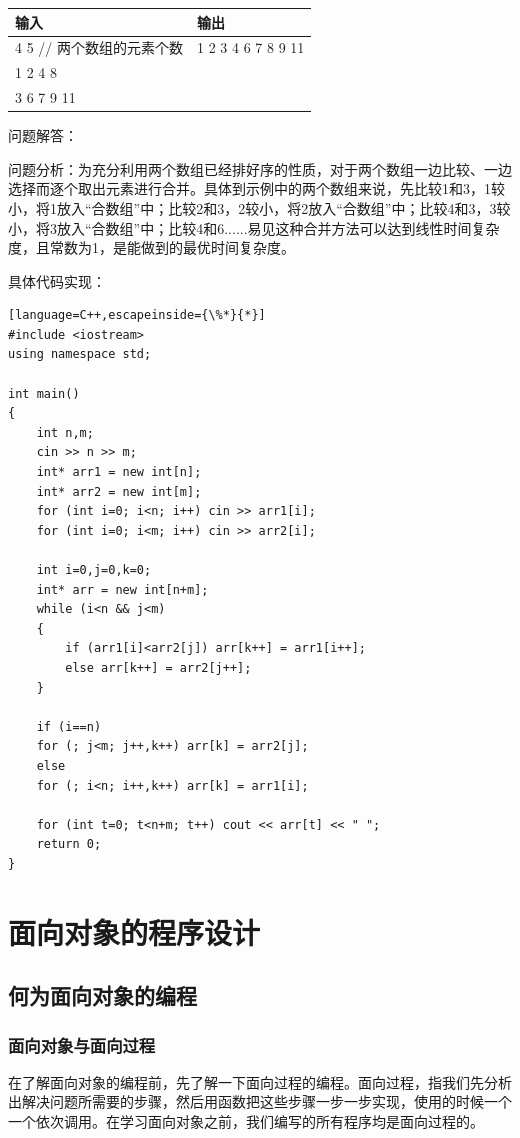 \documentclass[UTF8]{ctexart}
\begin{document}
\begin{itemize}
\begin{tabular}{|l|l|}
	\hline
	输入 & 输出 \\
	\hline
	4 5 // 两个数组的元素个数 & 1 2 3 4 6 7 8 9 11 \\
	1 2 4 8 & \\
	3 6 7 9 11 & \\
	\hline
\end{tabular}

问题解答：

问题分析：为充分利用两个数组已经排好序的性质，对于两个数组一边比较、一边选择而逐个取出元素进行合并。具体到示例中的两个数组来说，先比较1和3，1较小，将1放入“合数组”中；比较2和3，2较小，将2放入“合数组”中；比较4和3，3较小，将3放入“合数组”中；比较4和6......易见这种合并方法可以达到线性时间复杂度，且常数为1，是能做到的最优时间复杂度。

具体代码实现：
\begin{lstlisting}[language=C++,escapeinside={\%*}{*}]
#include <iostream>
using namespace std;

int main()
{
	int n,m;
	cin >> n >> m;
	int* arr1 = new int[n];
	int* arr2 = new int[m];
	for (int i=0; i<n; i++) cin >> arr1[i];
	for (int i=0; i<m; i++) cin >> arr2[i];
	
	int i=0,j=0,k=0;
	int* arr = new int[n+m];
	while (i<n && j<m)
	{
		if (arr1[i]<arr2[j]) arr[k++] = arr1[i++];
		else arr[k++] = arr2[j++];
	}
	
	if (i==n)
	for (; j<m; j++,k++) arr[k] = arr2[j];
	else
	for (; i<n; i++,k++) arr[k] = arr1[i];
	
	for (int t=0; t<n+m; t++) cout << arr[t] << " ";
	return 0;
}

\end{lstlisting}
\end{itemize}

\section{面向对象的程序设计}
\subsection{何为面向对象的编程}
\subsubsection{面向对象与面向过程}
在了解面向对象的编程前，先了解一下面向过程的编程。面向过程，指我们先分析出解决问题所需要的步骤，然后用函数把这些步骤一步一步实现，使用的时候一个一个依次调用。在学习面向对象之前，我们编写的所有程序均是面向过程的。
\end{document}
